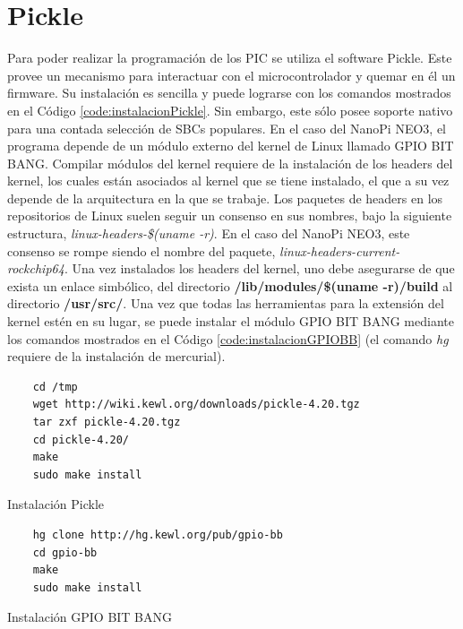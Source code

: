 \documentclass[12pt,letterpaper]{article}     %
\begin{document}
\section{Pickle}

Para poder realizar la programación de los PIC se utiliza el software Pickle. 
Este provee un mecanismo para interactuar con el microcontrolador y quemar en él un firmware.
Su instalación es sencilla y puede lograrse con los comandos mostrados en el Código \ref{code:instalacionPickle}.
Sin embargo, este sólo posee soporte nativo para una contada selección de SBCs populares. En el caso del NanoPi NEO3,
el programa depende de un módulo externo del kernel de Linux llamado GPIO BIT BANG.
Compilar módulos del kernel requiere de la instalación de los headers del kernel, los cuales están asociados al kernel
que se tiene instalado, el que a su vez depende de la arquitectura en la que se trabaje. Los paquetes de headers en los
repositorios de Linux suelen seguir un consenso en sus nombres, bajo la siguiente estructura, 
\textit{linux-headers-\$(uname -r)}. En el caso del NanoPi NEO3, este consenso se rompe siendo el nombre del paquete, 
\textit{linux-headers-current-rockchip64}. Una vez instalados los headers del kernel, uno debe asegurarse de que exista
un enlace simbólico, del directorio \textbf{/lib/modules/\$(uname -r)/build} al directorio \textbf{/usr/src/}.
Una vez que todas las herramientas para la extensión del kernel estén en su lugar, se puede instalar el módulo 
GPIO BIT BANG mediante los comandos mostrados en el Código \ref{code:instalacionGPIOBB} (el comando \textit{hg} requiere
de la instalación de mercurial).

\begin{codigo}[]
	\begin{lstlisting}
	cd /tmp
	wget http://wiki.kewl.org/downloads/pickle-4.20.tgz 
	tar zxf pickle-4.20.tgz 
	cd pickle-4.20/
	make
	sudo make install
	\end{lstlisting}
	\caption{Instalación Pickle}
	\label{code:instalacionPickle}
\end{codigo}

\begin{codigo}[!h]
	\begin{lstlisting}
	hg clone http://hg.kewl.org/pub/gpio-bb
	cd gpio-bb
	make
	sudo make install
	\end{lstlisting}
	\caption{Instalación GPIO BIT BANG}
	\label{code:instalacionGPIOBB}
\end{codigo}
\end{document}
